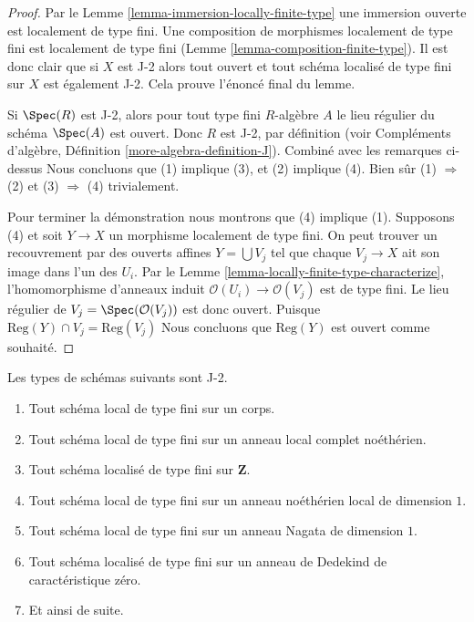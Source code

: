 \begin{proof}
Par le Lemme \ref{lemma-immersion-locally-finite-type} une immersion ouverte est localement de type
fini. Une composition de morphismes localement de type fini
est localement de type fini (Lemme
\ref{lemma-composition-finite-type}). Il est donc clair que si $X$ est J-2 alors tout
ouvert et tout schéma localisé de type fini sur
$X$ est également J-2. Cela prouve l’énoncé
final du lemme.

\medskip\noindent Si
$\Spec(R)$ est J-2, alors pour tout type fini $R$-algèbre $A$
le lieu régulier du schéma $\Spec(A)$ est ouvert. Donc $R$
est J-2, par définition
(voir Compléments d'algèbre, Définition \ref{more-algebra-definition-J}).
Combiné avec les remarques ci-dessus Nous concluons que (1) implique (3),
et (2) implique (4). Bien sûr (1) $\Rightarrow$ (2) et
(3) $\Rightarrow$ (4) trivialement.

\medskip\noindent
Pour terminer la démonstration nous montrons
que (4) implique (1). Supposons (4) et soit $Y \to X$
un morphisme localement de type fini. On peut trouver un
recouvrement par des ouverts affines $Y = \bigcup V_j$ tel
que chaque $V_j \to X$ ait son image dans l'un des $U_i$.
Par le Lemme \ref{lemma-locally-finite-type-characterize}, l'homomorphisme d'anneaux
induit $\mathcal{O}(U_i) \to \mathcal{O}(V_j)$ est de type fini.
Le lieu régulier de $V_j = \Spec(\mathcal{O}(V_j))$ est donc
ouvert. Puisque $\text{Reg}(Y) \cap V_j = \text{Reg}(V_j)$ Nous concluons que $\text{Reg}(Y)$
est ouvert comme souhaité.
\end{proof}

\begin{lemma}
\label{lemma-ubiquity-J-2}
Les types de schémas suivants sont J-2.
\begin{enumerate}
\item Tout schéma local de type fini sur un corps.
\item Tout schéma local de type fini sur un anneau local complet noéthérien.
\item Tout schéma localisé de type fini sur $\mathbf{Z}$.
\item Tout schéma local de type fini sur un anneau noéthérien local de dimension
$1$.
\item Tout schéma local de type fini sur un anneau Nagata de dimension $1$.
\item Tout schéma localisé de type fini sur un anneau de Dedekind de caractéristique
zéro.
\item Et ainsi de suite.
\end{enumerate}
\end{lemma}

